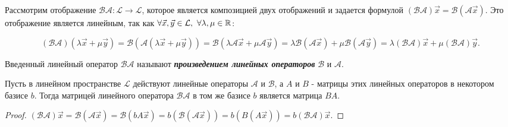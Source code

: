 Рассмотрим отображение $\mathscr{B}\mathscr{A} \colon \mathcal{L} \to \mathcal{L}$, которое является композицией двух отображений и задается формулой $(\mathscr{B}\mathscr{A})\vec{x} = \mathscr{B}(\mathscr{A}\vec{x})$. Это отображение является линейным, так как $\forall \vec{x}, \vec{y} \in \mathcal{L},\thinspace \thinspace \forall \lambda, \mu \in \mathbb{R}$:

$$(\mathscr{B}\mathscr{A})(\lambda\vec{x} + \mu\vec{y}) = \mathscr{B}(\mathscr{A}(\lambda\vec{x} + \mu\vec{y})) = \mathscr{B}(\lambda\mathscr{A}\vec{x} + \mu\mathscr{A}\vec{y}) = \lambda\mathscr{B}(\mathscr{A}\vec{x}) + \mu\mathscr{B}(\mathscr{A}\vec{y}) = \lambda(\mathscr{B}\mathscr{A})\vec{x} + \mu(\mathscr{B}\mathscr{A})\vec{y}.$$

Введенный линейный оператор $\mathscr{B}\mathscr{A}$ называют \textit{\textbf{произведением линейных операторов}} $\mathscr{B}$ и $\mathscr{A}$.

\begin{theorem}
    Пусть в линейном пространстве $\mathcal{L}$ действуют линейные операторы $\mathscr{A}$ и $\mathscr{B}$, а $A$ и $B$ - матрицы этих линейных операторов в некотором базисе $b$. Тогда матрицей линейного оператора $\mathscr{B}\mathscr{A}$ в том же базисе $b$ является матрица $BA$.
\end{theorem}

\begin{proof}
    $(\mathscr{B}\mathscr{A})\vec{x} = \mathscr{B}(\mathscr{A}\vec{x}) = \mathscr{B}(bA\vec{x}) = b(\mathscr{B}(\mathscr{A}\vec{x})) = b(B(A\vec{x})) = b(\mathscr{B}\mathscr{A})\vec{x}.$
\end{proof}

